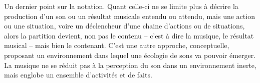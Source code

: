 \documentclass{article}
\begin{document}

Un dernier point sur la notation. Quant celle-ci ne se limite plus à décrire la production d'un son ou un résultat musicale entendu ou attendu, mais une action ou une situation, voire un déclencheur d'une chaine d'actions ou de situations, alors la partition devient, non pas le contenu -- c'est à dire la musique, le résultat musical -- mais bien le contenant. C'est une autre approche, conceptuelle, proposant un environnement dans lequel une écologie de sons va pouvoir émerger.  
La musique ne se réduit pas à la perception du son dans un  environnement inerte, mais englobe un ensemble d'activités et de faits.
 

%


%
\end{document}
